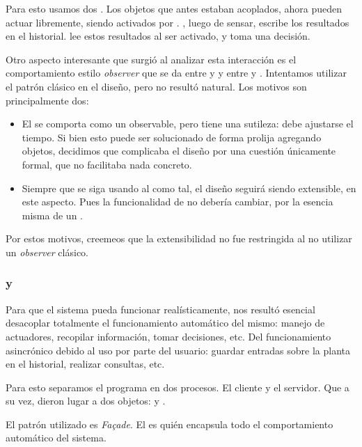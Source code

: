           Para esto usamos dos \timer{}. Los objetos que antes estaban acoplados, ahora
          pueden actuar libremente, siendo activados por \timer{}. \condiciones{}, luego
          de sensar, escribe los resultados en el historial. \decisiones{} lee estos
          resultados al ser activado, y toma una decisi\'on.

          Otro aspecto interesante que surgi\'o al analizar esta interacci\'on es
          el comportamiento estilo \textit{observer} que se da entre \timer{} y
          \condiciones{} y entre \timer{} y \decisiones{}. Intentamos utilizar el patr\'on
          cl\'asico en el dise\~no, pero no result\'o natural. Los motivos son
          principalmente dos:
          \begin{itemize}
              \item El \timer{} se comporta como un observable, pero tiene una sutileza:
                  debe ajustarse el tiempo. Si bien esto puede ser solucionado de
                  forma prolija agregando objetos, decidimos que complicaba el dise\~no
                  por una cuesti\'on \'unicamente formal, que no facilitaba nada
                  concreto.
              \item Siempre que se siga usando al \timer{} como tal, el dise\~no seguir\'a
                  siendo extensible, en este aspecto. Pues la funcionalidad de \timer{}
                  no deber\'ia cambiar, por la esencia misma de un \timer{}.
          \end{itemize}
          Por estos motivos, creemeos que la extensibilidad no fue restringida al
          no utilizar un \textit{observer} cl\'asico.

      \subsubsection{\cliente{} y \servidor{}}
          Para que el sistema pueda funcionar real\'isticamente, nos result\'o esencial
          desacoplar totalmente el funcionamiento autom\'atico del mismo: manejo de
          actuadores, recopilar informaci\'on, tomar decisiones, etc. Del funcionamiento
          asincr\'onico debido al uso por parte del usuario: guardar entradas sobre la
          planta en el historial, realizar consultas, etc.

          Para esto separamos el programa en dos procesos. El cliente y el servidor.
          Que a su vez, dieron lugar a dos objetos: \cliente{} y \servidor{}.

          El patr\'on utilizado es \textit{Façade}. El \servidor{} es qui\'en
          encapsula todo el comportamiento autom\'atico del sistema.

